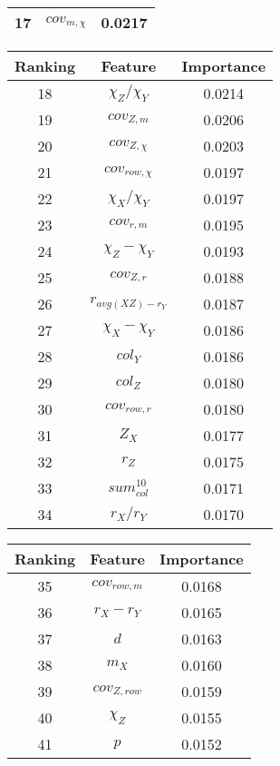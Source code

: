 \documentclass[pt10,journal=jacsat,manuscript=article,layout=twocolumn]{achemso}
\begin{document}
\begin{table*}
\begin{minipage}{0.25\textwidth}
\begin{tabular}{ccc}
17 & $cov_{m,\chi}$     &       0.0217\\
\bottomrule
\end{tabular}
\end{minipage} \hfill
\begin{minipage}{0.28\textwidth}
\begin{tabular}{ccc}
\toprule
  Ranking & Feature & Importance\\
\midrule
18 & $\chi_Z/\chi_Y$     &       0.0214\\
19 & $cov_{Z,m}$     &       0.0206\\
20 & $cov_{Z,\chi}$     &       0.0203\\
21 & $cov_{row,\chi}$     &       0.0197\\
22 & $\chi_X/\chi_Y$     &       0.0197\\
23 & $cov_{r,m}$     &       0.0195\\
24 & $\chi_Z-\chi_Y$     &       0.0193\\
25 & $cov_{Z,r}$     &       0.0188\\
26 & $r_{avg(XZ)-r_Y}$     &       0.0187\\
27 & $\chi_X-\chi_Y$     &       0.0186\\
28 & $col_Y$     &       0.0186\\
29 & $col_Z$     &       0.0180\\
30 & $cov_{row,r}$     &       0.0180\\
31 & $Z_X$     &       0.0177\\
32 & $r_Z$     &       0.0175\\
33 & $sum_{col}^{10}$     &       0.0171\\
34 & $r_X/r_Y$     &       0.0170\\
\bottomrule
\end{tabular}
\end{minipage} \hfill
\begin{minipage}{0.28\textwidth}
\begin{tabular}{ccc}
\toprule
  Ranking & Feature & Importance\\
\midrule
35 & $cov_{row,m}$     &       0.0168\\
36 & $r_X-r_Y$     &       0.0165\\
37 & $d$     &       0.0163\\
38 & $m_X$     &       0.0160\\
39 & $cov_{Z,row}$     &       0.0159\\
40 & $\chi_Z$     &       0.0155\\
41 & $p$     &       0.0152\\

\end{tabular}
\end{minipage}
\end{table*}
\end{document}
